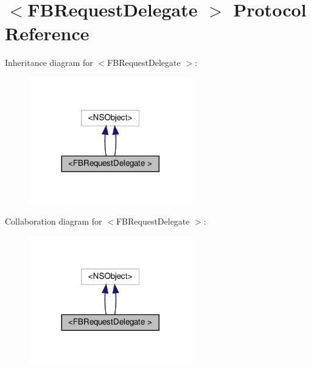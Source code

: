 \hypertarget{protocolFBRequestDelegate_01-p}{}\section{$<$F\+B\+Request\+Delegate $>$ Protocol Reference}
\label{protocolFBRequestDelegate_01-p}


Inheritance diagram for $<$F\+B\+Request\+Delegate $>$\+:
\nopagebreak
\begin{figure}[H]
\begin{center}
\leavevmode
\includegraphics[width=200pt]{protocolFBRequestDelegate_01-p__inherit__graph}
\end{center}
\end{figure}


Collaboration diagram for $<$F\+B\+Request\+Delegate $>$\+:
\nopagebreak
\begin{figure}[H]
\begin{center}
\leavevmode
\includegraphics[width=200pt]{protocolFBRequestDelegate_01-p__coll__graph}
\end{center}
\end{figure}
